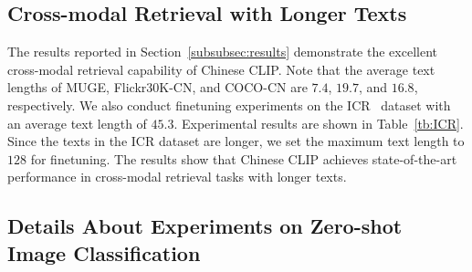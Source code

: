 \documentclass[11pt]{article}
\begin{document}
\subsection{Cross-modal Retrieval with Longer Texts}
The results reported in Section~\ref{subsubsec:results} demonstrate the excellent cross-modal retrieval capability of Chinese CLIP.
Note that the average text lengths of MUGE, Flickr30K-CN, and COCO-CN are $7.4$, $19.7$, and $16.8$, respectively.
We also conduct finetuning experiments on the ICR~\citep{r2d2} dataset with an average text length of $45.3$. 
Experimental results are shown in Table~\ref{tb:ICR}.
Since the texts in the ICR dataset are longer, we set the maximum text length to $128$ for finetuning.
The results show that Chinese CLIP achieves state-of-the-art performance in cross-modal retrieval tasks with longer texts.




\subsection{Details About Experiments on Zero-shot Image Classification}
\end{document}
